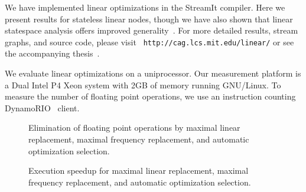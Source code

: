 
We have implemented linear optimizations in the StreamIt compiler.
Here we present results for stateless linear nodes, though we have
also shown that linear statespace analysis offers improved
generality~\cite{agrawal:cases:2005}.  For more detailed results,
stream graphs, and source code, please visit {\tt
http://cag.lcs.mit.edu/linear/} or see the accompanying
thesis~\cite{lamb-thesis}.

We evaluate linear optimizations on a uniprocessor.  Our measurement
platform is a Dual Intel P4 Xeon system with 2GB of memory running
GNU/Linux.  To measure the number of floating point operations, we use
an instruction counting DynamoRIO~\cite{dynamo99} client.

\begin{figure}[t]
\caption{Elimination of floating point operations by maximal linear 
replacement, maximal frequency replacement, and automatic optimization
selection.}
\label{fig:flops}
\end{figure}

\begin{figure}[t]
\centering
{}
\caption{Execution speedup for maximal linear replacement, maximal frequency 
replacement, and automatic optimization selection.}
\label{fig:execution-speedup}
\end{figure}

